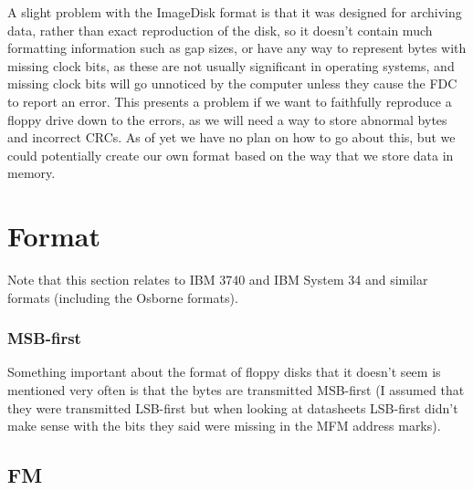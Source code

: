 \documentclass[a4paper]{article}
\begin{document}
A slight problem with the ImageDisk format is that it was designed for
archiving data, rather than exact reproduction of the disk, so it
doesn't contain much formatting information such as gap sizes, or have
any way to represent bytes with missing clock bits, as these are not usually
significant in operating systems, and missing clock bits will go
unnoticed by the computer unless they cause the FDC to report an
error. This presents a problem if we want to faithfully reproduce a
floppy drive down to the errors, as we will need a way to store
abnormal bytes and incorrect CRCs. As of yet we have no plan on how to
go about this, but we could potentially create our own format based on
the way that we store data in memory. 

\section{Format}

Note that this section relates to IBM 3740 and IBM System 34 and
similar formats (including the Osborne formats).

\subsubsection{MSB-first}

Something important about the format of floppy disks that it doesn't
seem is mentioned very often is that the bytes are transmitted
MSB-first (I assumed that they were transmitted LSB-first but when
looking at datasheets LSB-first didn't make sense with the bits they
said were missing in the MFM address marks).

\subsection{FM}
\end{document}
